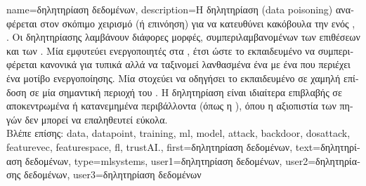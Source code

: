 {name={\foreignlanguage{greek}{δηλητηρίαση δεδομένων}}, 
 	description={\foreignlanguage{greek}{Η δηλητηρίαση}  
		(data poisoning) \foreignlanguage{greek}{αναφέρεται στον σκόπιμο χειρισμό (ή επινόηση)}  
		\foreignlanguage{greek}{για να κατευθύνει κακόβουλα την}  \foreignlanguage{greek}{ενός} 
		  \cite{Liu2021}, \cite{PoisonGAN}. 
  		\foreignlanguage{greek}{Οι}  \foreignlanguage{greek}{δηλητηρίασης}  
		\foreignlanguage{greek}{λαμβάνουν διάφορες μορφές, συμπεριλαμβανομένων των επιθέσεων}  
		\foreignlanguage{greek}{και των} . \foreignlanguage{greek}{Μία}  
		 \foreignlanguage{greek}{εμφυτεύει ενεργοποιητές στα}  , 
		\foreignlanguage{greek}{έτσι ώστε το εκπαιδευμένο}  \foreignlanguage{greek}{να συμπεριφέρεται 
		κανονικά για τυπικά}  \foreignlanguage{greek}{αλλά να ταξινομεί λανθασμένα ένα}
		 \foreignlanguage{greek}{με ένα}  \foreignlanguage{greek}{που 
		περιέχει ένα μοτίβο ενεργοποίησης. Μία}  \foreignlanguage{greek}{στοχεύει να 
		οδηγήσει το εκπαιδευμένο}  \foreignlanguage{greek}{σε χαμηλή επίδοση σε μία σημαντική
		περιοχή του} . \foreignlanguage{greek}{Η δηλητηρίαση}  
		\foreignlanguage{greek}{είναι ιδιαίτερα επιβλαβής σε αποκεντρωμένα ή κατανεμημένα περιβάλλοντα}  
		\foreignlanguage{greek}{(όπως η} ), \foreignlanguage{greek}{όπου η αξιοπιστία των πηγών}  
		\foreignlanguage{greek}{δεν μπορεί να επαληθευτεί εύκολα.} 
		\\
		\foreignlanguage{greek}{Βλέπε επίσης:} \gls{data}, \gls{datapoint}, \gls{training}, \gls{ml}, \gls{model}, \gls{attack}, 
		\gls{backdoor}, \gls{dosattack}, \gls{featurevec}, \gls{featurespace}, \gls{fl}, \gls{trustAI}.},
	first={\foreignlanguage{greek}{δηλητηρίαση δεδομένων}},
	text={\foreignlanguage{greek}{δηλητηρίαση δεδομένων}},
	type=mlsystems,
	user1={\foreignlanguage{greek}{δηλητηρίαση δεδομένων}}, %
    	user2={\foreignlanguage{greek}{δηλητηρίασης δεδομένων}}, %
	user3={\foreignlanguage{greek}{δηλητηρίαση δεδομένων}} %
}

